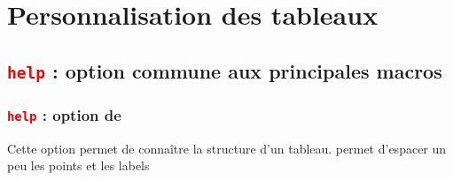 \section{Personnalisation des tableaux}\label{pers}

\subsection{\texttt{\textcolor{red}{help}} :  option commune aux principales macros}

\subsubsection{\texttt{\textcolor{red}{help}} :  option de }
Cette option permet de connaître la structure d'un tableau.  permet d'espacer un peu les points et les labels

\begin{tkzexample}[small]
\end{tkzexample}


